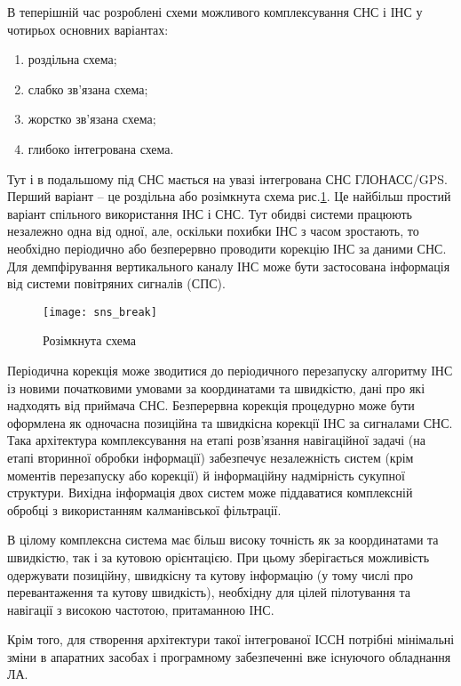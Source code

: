 В теперішній час розроблені схеми можливого комплексування СНС і ІНС у чотирьох 
основних варіантах:
\begin{enumerate}
\item роздільна схема;
\item слабко зв'язана схема;
\item жорстко зв'язана схема;
\item глибоко інтегрована схема.
\end{enumerate}

Тут і в подальшому під СНС мається на увазі інтегрована СНС ГЛОНАСС/GPS. 
Перший варіант -- це роздільна або розімкнута схема рис.\ref{fig:isns_break}.  Це  найбільш 
простий варіант спільного використання ІНС і СНС. Тут обидві системи працюють незалежно 
одна від одної, але, оскільки похибки ІНС з часом зростають, то необхідно періодично
або безперервно проводити корекцію ІНС за даними СНС. Для демпфірування вертикального 
каналу ІНС може бути застосована інформація від системи повітряних сигналів (СПС).
\begin{figure}[here]
\centering
\texttt{[image: sns\_break]}
\caption{Розімкнута схема}
\label{fig:isns_break}
\end{figure}

Періодична корекція може зводитися до періодичного перезапуску алгоритму ІНС із новими 
початковими умовами за координатами та швидкістю, дані про які надходять від приймача СНС. 
Безперервна корекція процедурно може бути оформлена як одночасна позиційна та 
швидкісна корекції ІНС за сигналами СНС. Така архітектура комплексування на  
етапі розв'язання навігаційної задачі (на етапі вторинної обробки інформації) 
забезпечує незалежність систем (крім моментів  перезапуску або корекції) й 
інформаційну надмірність сукупної структури. Вихідна інформація двох систем може 
піддаватися комплексній обробці з використанням калманівської фільтрації.

В цілому комплексна система має більш високу точність як за координатами та швидкістю, 
так і за кутовою орієнтацією. При цьому зберігається можливість одержувати позиційну, 
швидкісну та кутову інформацію (у тому числі про перевантаження та кутову швидкість), 
необхідну для цілей пілотування та навігації з високою частотою, притаманною ІНС.

Крім того, для створення  архітектури такої інтегрованої ІССН потрібні мінімальні зміни 
в апаратних засобах і програмному забезпеченні вже існуючого обладнання ЛА.

